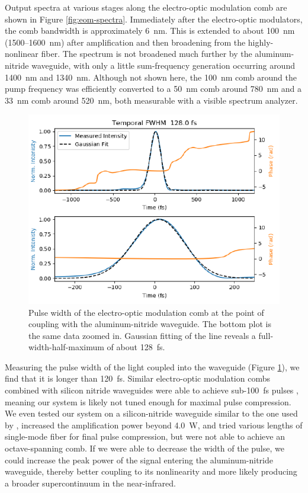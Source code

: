 Output spectra at various stages along the electro-optic modulation comb are shown in Figure \ref{fig:eom-spectra}. Immediately after the electro-optic modulators, the comb bandwidth is approximately 6~\si{\nano\meter}. This is extended to about 100~\si{\nano\meter} (1500--1600~\si{\nano\meter}) after amplification and then broadening from the highly-nonlinear fiber. The spectrum is not broadened much further by the aluminum-nitride waveguide, with only a little sum-frequency generation occurring around 1400~\si{\nano\meter} and 1340~\si{\nano\meter}. Although not shown here, the 100~\si{\nano\meter} comb around the pump frequency was efficiently converted to a 50~\si{\nano\meter} comb around 780~\si{\nano\meter} and a 33~\si{\nano\meter} comb around 520~\si{\nano\meter}, both measurable with a visible spectrum analyzer.

\begin{figure}
    \centering
    \includegraphics[width=\textwidth]{figures-3/eom-pulse.pdf}
    \caption[Electro-optic modulation comb pulse width]{Pulse width of the electro-optic modulation comb at the point of coupling with the aluminum-nitride waveguide. The bottom plot is the same data zoomed in. Gaussian fitting of the line reveals a full-width-half-maximum of about 128~\si{\femto\second}.}
    \label{fig:eom-pulse}
\end{figure}

Measuring the pulse width of the light coupled into the waveguide (Figure \ref{fig:eom-pulse}), we find that it is longer than 120~\si{\femto\second}. Similar electro-optic modulation combs combined with silicon nitride waveguides were able to achieve sub-100~\si{\femto\second} pulses \citep{carlson_ultrafast_2017, obrzud_visible_2019}, meaning our system is likely not tuned enough for maximal pulse compression. We even tested our system on a silicon-nitride waveguide similar to the one used by \citet{carlson_ultrafast_2017}, increased the amplification power beyond 4.0~\si{\watt}, and tried various lengths of single-mode fiber for final pulse compression, but were not able to achieve an octave-spanning comb. If we were able to decrease the width of the pulse, we could increase the peak power of the signal entering the aluminum-nitride waveguide, thereby better coupling to its nonlinearity and more likely producing a broader supercontinuum in the near-infrared.

